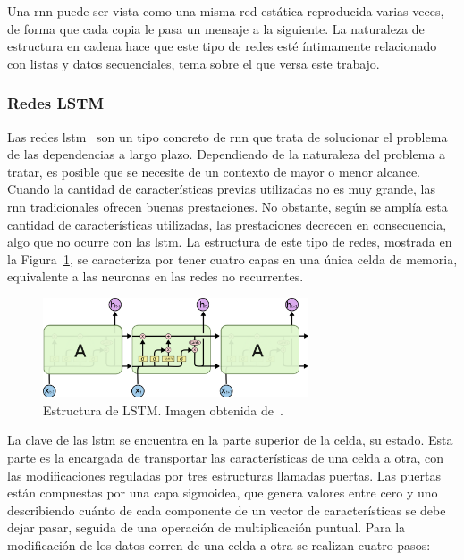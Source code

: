 Una \acrshort{rnn} puede ser vista como una misma red estática reproducida varias veces, de forma que cada copia le pasa un mensaje a la siguiente. La naturaleza de estructura en cadena hace que este tipo de redes esté íntimamente relacionado con listas y datos secuenciales, tema sobre el que versa este trabajo.

\subsubsection{Redes LSTM} \label{ap.lstm}
Las redes \acrfull{lstm}~\cite{lstm} son un tipo concreto de \acrshort{rnn} que trata de solucionar el problema de las dependencias a largo plazo. Dependiendo de la naturaleza del problema a tratar, es posible que se necesite de un contexto de mayor o menor alcance. Cuando la cantidad de características previas utilizadas no es muy grande, las \acrshort{rnn} tradicionales ofrecen buenas prestaciones. No obstante, según se amplía esta cantidad de características utilizadas, las prestaciones decrecen en consecuencia, algo que no ocurre con las \acrshort{lstm}. La estructura de este tipo de redes, mostrada en la Figura~\ref{fig.lstm}, se caracteriza por tener cuatro capas en una única celda de memoria, equivalente a las neuronas en las redes no recurrentes.

\vspace{10pt}
\begin{figure}[H]
	\begin{center}
		\includegraphics[width=0.7\textwidth]{ figures/intro/lstm.png}
		\caption{Estructura de LSTM. Imagen obtenida de~\cite{lstm}.
		}
		\label{fig.lstm}
	\end{center}
\end{figure}
\vspace{-10pt}

La clave de las \acrshort{lstm} se encuentra en la parte superior de la celda, su estado. Esta parte es la encargada de transportar las características de una celda a otra, con las modificaciones reguladas por tres estructuras llamadas puertas. Las puertas están compuestas por una capa sigmoidea, que genera valores entre cero y uno describiendo cuánto de cada componente de un vector de características se debe dejar pasar, seguida de una operación de multiplicación puntual. Para la modificación de los datos corren de una celda a otra se realizan cuatro pasos:

